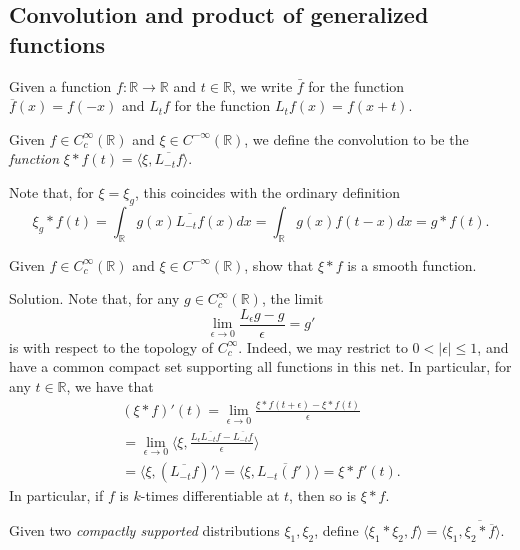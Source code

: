 \documentclass[12pt, draft,reqno,a4paper, twoside]{amsproc}
\newcommand{\dbR}{\mathbb R}
\newcommand{\gen}[1]{\langle{#1}\rangle}
\newcommand{\abs}[1]{\left|#1\right|}
\newcommand{\widebar}{\overline}
\newenvironment{sol}{\sc Solution. \rm}{\hfill \qedsymbol\bigskip}
\begin{document}
\subsection{Convolution and product of generalized functions}
\begin{nota}Given a function $f:\dbR\to\dbR$ and $t\in \dbR$, we write $\bar{f}$ for the function $\widebar{f}(x)=f(-x)$ and $L_tf $ for the function $L_tf(x)=f(x+t)$.
\end{nota}

\begin{defi}Given $f\in C_c^\infty(\dbR)$ and $\xi\in C^{-\infty}(\dbR)$, we define the convolution to be the \emph{function} $\xi\ast f(t)=\gen{\xi,\widebar{L_{-t}f}}$. 
\end{defi}
Note that, for $\xi=\xi_g$, this coincides with the ordinary definition \[\xi_g\ast f(t)=\int_\dbR g(x)\widebar{L_{-t}f}(x)dx=\int_{\dbR}g(x)f(t-x)dx=g\ast f(t).\]

\begin{exer}Given $f\in C_c^\infty(\dbR)$ and $\xi\in C^{-\infty}(\dbR)$, show that $\xi\ast f$ is a smooth function.
\end{exer}
\begin{sol}Note that, for any $g\in C_c^\infty(\dbR)$, the limit
\[\lim_{\epsilon\to 0}\frac{L_\epsilon g-g}{\epsilon}=g'\]
is with respect to the topology of $C_c^\infty$. Indeed, we may restrict to $0<\abs{\epsilon}\le 1$, and have a common compact set supporting all functions in this net. In particular, for any $t\in \dbR$, we have that
\begin{multline*}(\xi\ast f)'(t)=\lim_{\epsilon\to 0}\frac{\xi\ast f(t+\epsilon)-\xi\ast f(t)}{\epsilon}\\
=\lim_{\epsilon\to 0}\gen{\xi, \frac{L_\epsilon\widebar{L_{-t}f}-\widebar{L_{-t}f}}{\epsilon}}\\
=\gen{\xi,(\widebar{L_{-t}f})'}=\gen{\xi,\widebar{L_{-t}(f')}}=\xi\ast f'(t).
\end{multline*}
In particular, if $f$ is $k$-times differentiable at $t$, then so is $\xi\ast f$. 
\end{sol}

\begin{defi} Given two \emph{compactly supported} distributions $\xi_1,\xi_2$, define $\gen{\xi_1\ast\xi_2,f}=\gen{\xi_1,\widebar{\xi_2\ast\widebar{f}}}$.
\end{defi}
\end{document}
